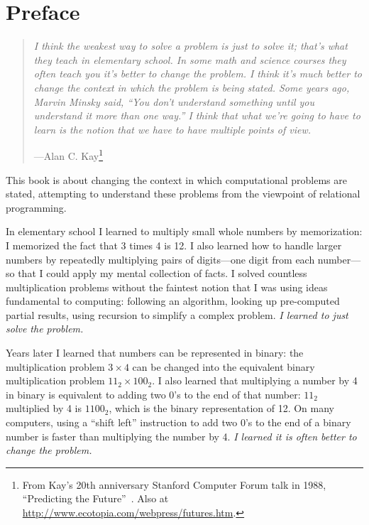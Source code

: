 \chapter{Preface}\label{sec:preface}

\vspace{-1cm}

\begin{quotation}
\noindent
\emph{I think the weakest way to solve a problem is just to solve it; that's what they teach in elementary school. In some math and science courses they often teach you it's better to change the problem. I think it's much better to change the context in which the problem is being stated. Some years ago, Marvin Minsky said, ``You don't understand something until you understand it more than one way.'' I think that what we're going to have to learn is the notion that we have to have multiple points of view.}
\begin{flushright}
\vspace{-0.3em}
---Alan C. Kay\footnote{From Kay's 20th anniversary Stanford Computer Forum talk in 1988, ``Predicting the Future''~\cite{Kay:1989}. Also at \url{http://www.ecotopia.com/webpress/futures.htm}.}
\end{flushright}
\end{quotation}


This book is about changing the context in which computational
problems are stated, attempting to understand these problems from the
viewpoint of relational programming.


In elementary school I learned to multiply small whole numbers by
memorization: I memorized the fact that 3 times 4 is 12.
%
I also learned how to handle larger numbers by repeatedly
multiplying pairs of digits---one digit from each number---so that I
could apply my mental collection of facts.
%
I solved countless multiplication problems without the faintest notion
that I was using ideas fundamental to computing: following an
algorithm, looking up pre-computed partial results, using recursion
to simplify a complex problem.
%
\emph{I learned to just solve the problem.}


Years later I learned that numbers can be represented in binary: the
multiplication problem \mbox{$3 \times 4$} can be changed into the
equivalent binary multiplication problem \mbox{$11_2 \times 100_2$}.
%
I also learned that multiplying a number by 4 in binary is equivalent
to adding two 0's to the end of that number: $11_2$ multiplied by 4 is
$1100_2$, which is the binary representation of 12.
%
On many computers, using a ``shift left'' instruction to add two 0's to
the end of a binary number is faster than multiplying the number by 4.
%
\emph{I learned it is often better to change the problem.}






